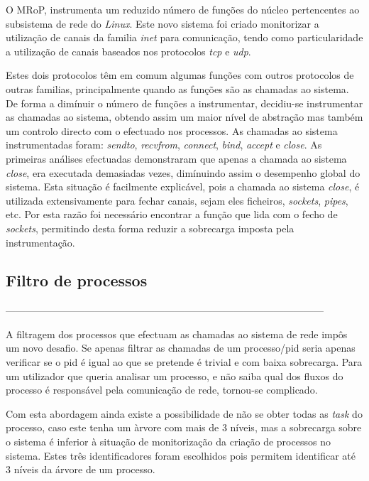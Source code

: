 O MRoP, instrumenta um reduzido número de funções do núcleo pertencentes ao subsistema de rede do \textit{Linux}.
Este novo sistema foi criado monitorizar a utilização de canais da familia \textit{inet} para comunicação, tendo como particularidade a utilização de canais baseados nos protocolos \textit{tcp} e \textit{udp}.


Estes dois protocolos têm em comum algumas funções com outros protocolos de outras familias, principalmente quando as funções são as chamadas ao sistema.
De forma a dimínuir o número de funções a instrumentar, decidiu-se instrumentar as chamadas ao sistema, obtendo assim um maior nível de abstração mas também um controlo directo com o efectuado nos processos.
As chamadas ao sistema instrumentadas foram: \textit{sendto}, \textit{recvfrom}, \textit{connect}, \textit{bind}, \textit{accept} e \textit{close}.
As primeiras análises efectuadas demonstraram que apenas a chamada ao sistema \textit{close}, era executada demasiadas vezes, dimínuindo assim o desempenho global do sistema.
Esta situação é facilmente explicável, pois a chamada ao sistema \textit{close}, é utilizada extensivamente para fechar canais, sejam eles ficheiros, \textit{sockets}, \textit{pipes}, etc.
Por esta razão foi necessário encontrar a função que lida com o fecho de \textit{sockets}, permitindo desta forma reduzir a sobrecarga imposta pela instrumentação.


\subsection{Filtro de processos}
------------------------------------------------------------------------------------------------

A filtragem dos processos que efectuam as chamadas ao sistema de rede impôs um novo desafio.
 Se apenas filtrar as chamadas de um processo/pid seria apenas verificar se o pid é igual ao que se pretende é trivial e com baixa sobrecarga.
 Para um utilizador que queria analisar um processo, e não saiba qual dos fluxos do processo é responsável pela comunicação de rede, tornou-se complicado.

Com esta abordagem ainda existe a possibilidade de não se obter todas as \textit{task} do processo, caso este tenha um àrvore com mais de 3 níveis, mas a sobrecarga sobre o sistema é inferior à situação de monitorização da criação de processos no sistema.
 Estes três identificadores foram escolhidos pois permitem identificar até 3 níveis da árvore de um processo.

